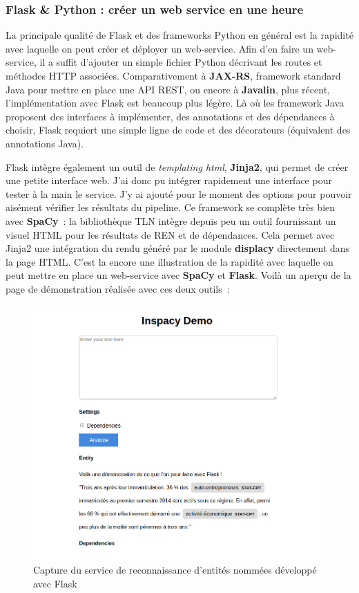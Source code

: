 \subsubsection*{Flask \& Python : créer un web service en une heure}
La principale qualité de Flask et des frameworks Python en général est la rapidité avec laquelle on peut créer et déployer un web-service. Afin d'en faire un web-service, il a suffit d'ajouter un simple fichier Python décrivant les routes et méthodes HTTP associées. Comparativement à \textbf{JAX-RS}, framework standard Java pour mettre en place une API REST, ou encore à \textbf{Javalin}, plus récent, l'implémentation avec Flask est beaucoup plus légère. Là où les framework Java proposent des interfaces à implémenter, des annotations et des dépendances à choisir, Flask requiert une simple ligne de code et des décorateurs (équivalent des annotations Java).
\newline

Flask intègre également un outil de \textit{templating html}, \textbf{Jinja2}, qui permet de créer une petite interface web. J'ai donc pu intégrer rapidement une interface pour tester à la main le service. J'y ai ajouté pour le moment des options pour pouvoir aisément vérifier les résultats du pipeline. Ce framework se complète très bien avec \textbf{SpaCy}~: la bibliothèque TLN intègre depuis peu un outil fournissant un visuel HTML pour les résultats de REN et de dépendances. Cela permet avec Jinja2 une intégration du rendu généré par le module \textbf{displacy} directement dans la page HTML. C'est la encore une illustration de la rapidité avec laquelle on peut mettre en place un web-service avec \textbf{SpaCy} et \textbf{Flask}. Voilà un aperçu de la page de démonstration réalisée avec ces deux outils~:
\begin{figure}[H]
    \centering
    \includegraphics[scale=0.6]{images/inspaCy-demo.png}
    \caption{Capture du service de reconnaissance d'entités nommées développé avec Flask}
    \label{fig:demo-inspaCy}
\end{figure}

